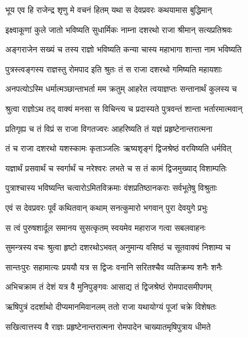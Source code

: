 
\twolineshloka
{भूय एव हि राजेन्द्र शृणु मे वचनं हितम्}
{यथा स देवप्रवरः कथयामास बुद्धिमान्} %

\twolineshloka
{इक्ष्वाकूणां कुले जातो भविष्यति सुधार्मिकः}
{नाम्ना दशरथो राजा श्रीमान् सत्यप्रतिश्रवः} %

\twolineshloka
{अङ्गराजेन सख्यं च तस्य राज्ञो भविष्यति}
{कन्या चास्य महाभागा शान्ता नाम भविष्यति} %

\twolineshloka
{पुत्रस्त्वङ्गस्य राज्ञस्तु रोमपाद इति श्रुतः}
{तं स राजा दशरथो गमिष्यति महायशाः} %

\twolineshloka
{अनपत्योऽस्मि धर्मात्मञ्छान्ताभर्ता मम क्रतुम्}
{आहरेत त्वयाज्ञप्तः सन्तानार्थं कुलस्य च} %

\twolineshloka
{श्रुत्वा राज्ञोऽथ तद् वाक्यं मनसा स विचिन्त्य च}
{प्रदास्यते पुत्रवन्तं शान्ता भर्तारमात्मवान्} %

\twolineshloka
{प्रतिगृह्य च तं विप्रं स राजा विगतज्वरः}
{आहरिष्यति तं यज्ञं प्रहृष्टेनान्तरात्मना} %

\twolineshloka
{तं च राजा दशरथो यशस्कामः कृताञ्जलिः}
{ऋष्यशृङ्गं द्विजश्रेष्ठं वरयिष्यति धर्मवित्} %

\twolineshloka
{यज्ञार्थं प्रसवार्थं च स्वर्गार्थं च नरेश्वरः}
{लभते च स तं कामं द्विजमुख्याद् विशाम्पतिः} %

\twolineshloka
{पुत्राश्चास्य भविष्यन्ति चत्वारोऽमितविक्रमाः}
{वंशप्रतिष्ठानकराः सर्वभूतेषु विश्रुताः} %

\twolineshloka
{एवं स देवप्रवरः पूर्वं कथितवान् कथाम्}
{सनत्कुमारो भगवान् पुरा देवयुगे प्रभुः} %

\twolineshloka
{स त्वं पुरुषशार्दूल समानय सुसत्कृतम्}
{स्वयमेव महाराज गत्वा सबलवाहनः} %

\twolineshloka
{सुमन्त्रस्य वचः श्रुत्वा हृष्टो दशरथोऽभवत्}
{अनुमान्य वसिष्ठं च सूतवाक्यं निशाम्य च} %

\twolineshloka
{सान्तःपुरः सहामात्यः प्रययौ यत्र स द्विजः}
{वनानि सरितश्चैव व्यतिक्रम्य शनैः शनैः} %

\twolineshloka
{अभिचक्राम तं देशं यत्र वै मुनिपुङ्गवः}
{आसाद्य तं द्विजश्रेष्ठं रोमपादसमीपगम्} %

\twolineshloka
{ऋषिपुत्रं ददर्शाथो दीप्यमानमिवानलम्}
{ततो राजा यथायोग्यं पूजां चक्रे विशेषतः} %

\twolineshloka
{सखित्वात्तस्य वै राज्ञः प्रहृष्टेनान्तरात्मना}
{रोमपादेन चाख्यातमृषिपुत्राय धीमते} %


